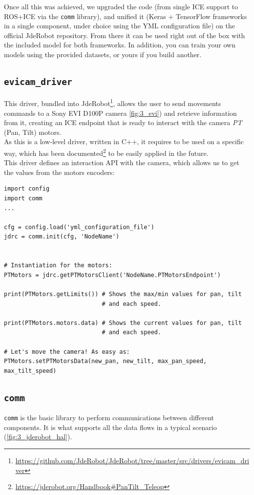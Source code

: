 		
		Once all this was achieved, we upgraded the code (from single ICE support to ROS+ICE via the \texttt{comm} library), and unified it (Keras + TensorFlow frameworks in a single component, under choice using the YML configuration file) on the official JdeRobot repository. From there it can be used right out of the box with the included model for both frameworks. In addition, you can train your own models using the provided datasets, or yours if you build another.
	
	
	\subsection{\texttt{evicam\_driver}}
	\label{sec:3_evicam_driver}
	This driver, bundled into JdeRobot\footnote{\url{https://github.com/JdeRobot/JdeRobot/tree/master/src/drivers/evicam\_driver}}, allows the user to send movements commands to a Sony EVI D100P camera \autoref{fig:3_evi}) and retrieve information from it, creating an ICE endpoint that is ready to interact with the camera \emph{PT} (Pan, Tilt) motors.\\
	
	As this is a low-level driver, written in C++, it requires to be used on a specific way, which has been documented\footnote{\url{https://jderobot.org/Handbook\#PanTilt_Teleop}} to be easily applied in the future.\\
	
	This driver defines an interaction API with the camera, which allows us to get the values from the motors encoders:
	\begin{lstlisting}
import config
import comm
...

cfg = config.load('yml_configuration_file')
jdrc = comm.init(cfg, 'NodeName')


# Instantiation for the motors:
PTMotors = jdrc.getPTMotorsClient('NodeName.PTMotorsEndpoint')

print(PTMotors.getLimits()) # Shows the max/min values for pan, tilt 
                            # and each speed.

print(PTMotors.motors.data) # Shows the current values for pan, tilt
                            # and each speed.

# Let's move the camera! As easy as:
PTMotors.setPTMotorsData(new_pan, new_tilt, max_pan_speed, max_tilt_speed)
	\end{lstlisting}
	
	\subsection{\texttt{comm}}
		\label{sec:3_comm}
		\texttt{comm} is the basic library to perform communications between different components. It is what supports all the data flows in a typical scenario (\autoref{fig:3_jderobot_hal}).\\
		
